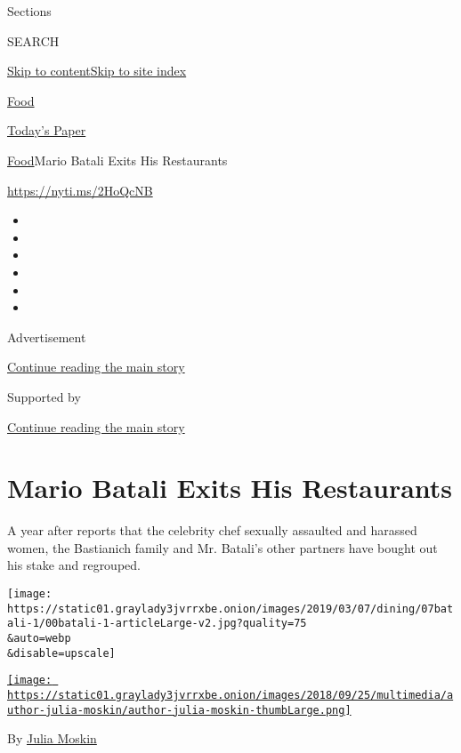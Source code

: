Sections

SEARCH

\protect\hyperlink{site-content}{Skip to
content}\protect\hyperlink{site-index}{Skip to site index}

\href{https://www.nytimes3xbfgragh.onion/section/food}{Food}

\href{https://myaccount.nytimes3xbfgragh.onion/auth/login?response_type=cookie\&client_id=vi}{}

\href{https://www.nytimes3xbfgragh.onion/section/todayspaper}{Today's
Paper}

\href{/section/food}{Food}\textbar{}Mario Batali Exits His Restaurants

\url{https://nyti.ms/2HoQcNB}

\begin{itemize}
\item
\item
\item
\item
\item
\item
\end{itemize}

Advertisement

\protect\hyperlink{after-top}{Continue reading the main story}

Supported by

\protect\hyperlink{after-sponsor}{Continue reading the main story}

\hypertarget{mario-batali-exits-his-restaurants}{%
\section{Mario Batali Exits His
Restaurants}\label{mario-batali-exits-his-restaurants}}

A year after reports that the celebrity chef sexually assaulted and
harassed women, the Bastianich family and Mr. Batali's other partners
have bought out his stake and regrouped.

\texttt{[image: https://static01.graylady3jvrrxbe.onion/images/2019/03/07/dining/07batali-1/00batali-1-articleLarge-v2.jpg?quality=75\\\&auto=webp\\\&disable=upscale]}

\href{https://www.nytimes3xbfgragh.onion/by/julia-moskin}{\texttt{[image: https://static01.graylady3jvrrxbe.onion/images/2018/09/25/multimedia/author-julia-moskin/author-julia-moskin-thumbLarge.png]}}

By \href{https://www.nytimes3xbfgragh.onion/by/julia-moskin}{Julia
Moskin}


